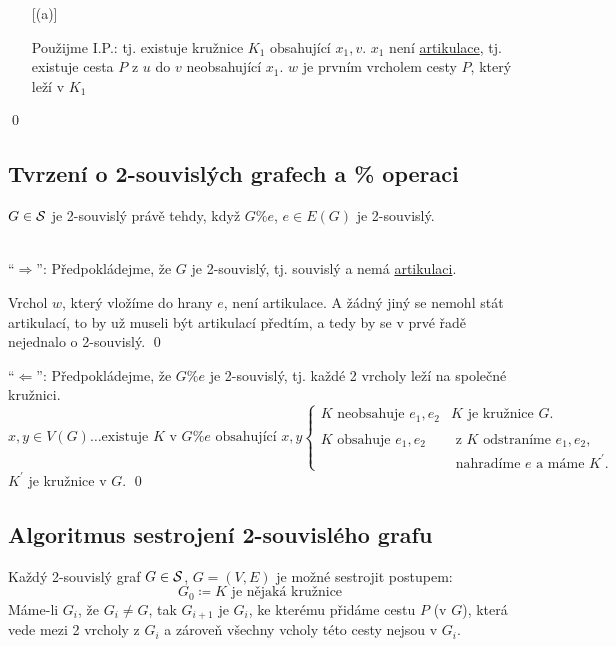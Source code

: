\begin{enumerate} [(a)]
\begin{figure}[H]
    \end{figure}
    Použijme I.P.: tj. existuje kružnice $K_1$ obsahující $x_1, v$. $x_1$ není \hyperref[artikulace]{artikulace}, tj. 
    existuje cesta $P$ z $u$ do $v$ neobsahující $x_1$. $w$ je prvním vrcholem cesty $P$, který leží v $K_1$ 
\end{enumerate}
\hspace{\fill}\qed

\subsection{Tvrzení o 2-souvislých grafech a \% operaci}
$G \in \S$ je 2-souvislý právě tehdy, když $G \% e$, $e \in E(G)$ je 2-souvislý.

\\
\enquote{$\Rightarrow$}: Předpokládejme, že $G$ je 2-souvislý, tj. souvislý a nemá \hyperref[artikulace]{artikulaci}.

Vrchol $w$, který vložíme do hrany $e$, není artikulace. A žádný jiný se nemohl stát artikulací, to by už museli být 
artikulací předtím, a tedy by se v prvé řadě nejednalo o 2-souvislý.
\hspace{\fill}\qed

\enquote{$\Leftarrow$}: Předpokládejme, že $G \% e$ je 2-souvislý, tj. každé 2 vrcholy leží na společné kružnici.
\[
    x, y \in V(G) \dots \text{existuje } K \text{ v } G \% e \text{ obsahující } x, y
    \begin{cases}
        K \text{ neobsahuje } e_1, e_2 & K \text{ je kružnice } G. \\
        \\
        K \text{ obsahuje } e_1, e_2 & \text{ z } K \text{ odstraníme } e_1, e_2, \\ 
        & \text{ nahradíme } e \text{ a máme } K^\prime.
    \end{cases}
\]
$K^\prime$ je kružnice v $G$. 
\hspace{\fill}\qed

\subsection{Algoritmus sestrojení 2-souvislého grafu}
Každý 2-souvislý graf $G \in \S$, $G = (V,E)$ je možné sestrojit postupem:
\[ G_0 \coloneq K \text{ je nějaká kružnice}\]
Máme-li $G_i$, že $G_i \not= G$, tak $G_{i+1}$ je $G_i$, ke kterému přidáme cestu $P$ (v $G$), která vede mezi 2 vrcholy
z $G_i$ a zároveň všechny vcholy této cesty nejsou v $G_i$.

